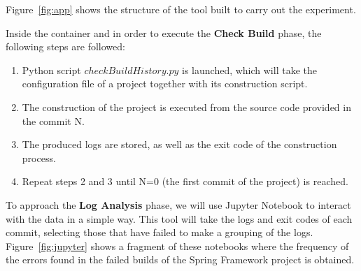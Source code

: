 
Figure~\ref{fig:app} shows the structure of the tool built to carry out the experiment.

Inside the container and in order to execute the \textbf{Check Build} phase, the following steps are followed:
\begin{enumerate}
	\item Python script $checkBuildHistory.py$ is launched, which will take the configuration file of a project together with its construction script.
	\item The construction of the project is executed from the source code provided in the commit N.
	\item The produced logs are stored, as well as the exit code of the construction process.
	\item Repeat steps 2 and 3 until N=0 (the first commit of the project) is reached.
\end{enumerate}

To approach the \textbf{Log Analysis} phase, we will use Jupyter Notebook to interact with the data in a simple way. This tool will take the logs and exit codes of each commit, selecting those that have failed to make a grouping of the logs. Figure~\ref{fig:jupyter} shows a fragment of these notebooks where the frequency of the errors found in the failed builds of the Spring Framework project is obtained. 



